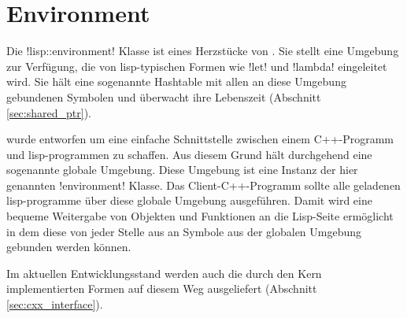 \section{Environment}
\label{sec:environment}

Die !lisp::environment! Klasse ist eines Herzstücke von \projectname{}.
Sie stellt eine Umgebung zur Verfügung, die von lisp-typischen Formen wie !let! und !lambda!
eingeleitet wird. Sie hält eine sogenannte Hashtable mit allen an diese Umgebung gebundenen
Symbolen und überwacht ihre Lebenszeit (Abschnitt \ref{sec:shared_ptr}).

\projectname{} wurde entworfen um eine einfache Schnittstelle zwischen einem C++-Programm
und lisp-programmen zu schaffen. Aus diesem Grund hält \projectname{} durchgehend
eine sogenannte globale Umgebung. Diese Umgebung ist eine Instanz der hier genannten 
!environment! Klasse. Das Client-C++-Programm sollte alle geladenen lisp-programme
über diese globale Umgebung ausgeführen. Damit wird eine bequeme Weitergabe von Objekten
und Funktionen an die Lisp-Seite ermöglicht in dem diese von jeder Stelle aus an Symbole
aus der globalen Umgebung gebunden werden können.

Im aktuellen Entwicklungsstand werden auch die durch den Kern implementierten
Formen auf diesem Weg ausgeliefert (Abschnitt \ref{sec:cxx_interface}).

